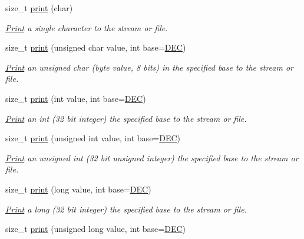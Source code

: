 \begin{DoxyCompactItemize}
size\+\_\+t \hyperlink{class_print_a1e411d07a8ffec5faf7ce485bac0f029}{print} (char)
\begin{DoxyCompactList}\small\item\em \hyperlink{class_print}{Print} a single character to the stream or file. \end{DoxyCompactList}\item 
size\+\_\+t \hyperlink{class_print_ae35481e77567618140cd58d8b96d3747}{print} (unsigned char value, int base=\hyperlink{docs_2src_2spark__wiring__print_8h_a26e216c38cffa0a9965fa7933ba558b1}{D\+EC})
\begin{DoxyCompactList}\small\item\em \hyperlink{class_print}{Print} an unsigned char (byte value, 8 bits) in the specified base to the stream or file. \end{DoxyCompactList}\item 
size\+\_\+t \hyperlink{class_print_aa28ddbde83b14df73b41c919ecc4478f}{print} (int value, int base=\hyperlink{docs_2src_2spark__wiring__print_8h_a26e216c38cffa0a9965fa7933ba558b1}{D\+EC})
\begin{DoxyCompactList}\small\item\em \hyperlink{class_print}{Print} an int (32 bit integer) the specified base to the stream or file. \end{DoxyCompactList}\item 
size\+\_\+t \hyperlink{class_print_afcd7d3a184df961a502643e4fb638c52}{print} (unsigned int value, int base=\hyperlink{docs_2src_2spark__wiring__print_8h_a26e216c38cffa0a9965fa7933ba558b1}{D\+EC})
\begin{DoxyCompactList}\small\item\em \hyperlink{class_print}{Print} an unsigned int (32 bit unsigned integer) the specified base to the stream or file. \end{DoxyCompactList}\item 
size\+\_\+t \hyperlink{class_print_a0c663ac015ebc037ea044ba2e2cf2947}{print} (long value, int base=\hyperlink{docs_2src_2spark__wiring__print_8h_a26e216c38cffa0a9965fa7933ba558b1}{D\+EC})
\begin{DoxyCompactList}\small\item\em \hyperlink{class_print}{Print} a long (32 bit integer) the specified base to the stream or file. \end{DoxyCompactList}\item 
size\+\_\+t \hyperlink{class_print_acb8c6dcd4339b024436002aa9a6f4be2}{print} (unsigned long value, int base=\hyperlink{docs_2src_2spark__wiring__print_8h_a26e216c38cffa0a9965fa7933ba558b1}{D\+EC})

\end{DoxyCompactItemize}
